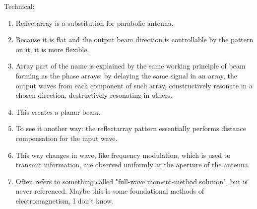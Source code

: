 \documentclass{article}
\begin{document}
    Technical:
    \begin{enumerate}
        \item Reflectarray is a substitution for parabolic antenna.
        \item Because it is flat and the output beam direction is controllable by the pattern on it, it is more flexible.
        \item Array part of the name is explained by the same working principle of beam forming as the phase arrays: by delaying the same signal in an array, the output waves from each component of such array, constructively resonate in a chosen direction, destructively resonating in others.
        \item This creates a planar beam.
        \item To see it another way: the reflectarray pattern essentially performs distance compensation for the input wave.
        \item This way changes in wave, like frequency modulation, which is used to transmit information, are observed uniformly at the aperture of the antenna.
        \item Often refers to something called "full-wave moment-method solution", but is never referenced.
        Maybe this is some foundational methods of electromagnetism, I don't know.
    \end{enumerate}
\end{document}

